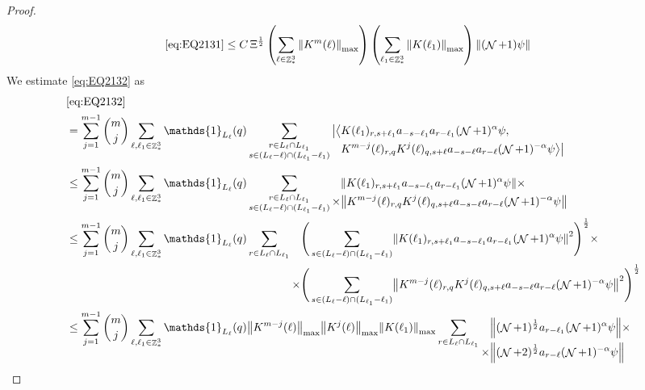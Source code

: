 \documentclass[sn-mathphys, Numbered ,a4paper]{sn-jnl}%
\DeclareMathOperator{\Z}{\mathbb{Z}}
\DeclareMathOperator{\NN}{\mathcal{N}}
\newcommand{\half}{\frac{1}{2}}
\theoremstyle{plain}
\theoremstyle{definition}
\theoremstyle{remark}
\theoremstyle{plain}
\theoremstyle{definition}
\theoremstyle{remark}
\begin{document}
\begin{proof}
\begin{align}
	\eqref{eq:EQ2131}&\leq C\, \Xi^\half \left(\sum\limits_{\ell\in \Z^3_*} \norm{K^m(\ell)}_{\mathrm{max}}\right)\left(  \sum\limits_{ \ell_1\in \Z^3_*}  \norm{ K(\ell_1)}_{\mathrm{max}} \right) \norm{ (\NN+1) \psi}\label{eq:estEQ2131} 
\end{align}  
We estimate \eqref{eq:EQ2132} as
\begin{align}
	&\eqref{eq:EQ2132}\nonumber\\
    &=\sum\limits_{j=1}^{m-1} {{m}\choose j} \sum\limits_{\ell, \ell_1\in \Z^3_*}\mathds{1}_{L_{\ell}}(q) \sum\limits_{\substack{r\in L_{\ell} \cap L_{\ell_1}\\ s \in (L_{\ell}-\ell) \cap (L_{\ell_1}-\ell_1)}} \begin{aligned}[t] \big|\big<&K(\ell_1)_{r,s+\ell_1}a_{-s-\ell_1} a_{r-\ell_1} (\NN+1)^{\alpha} \psi,\nonumber\\  &K^{m-j}(\ell)_{r,q} K^{j}(\ell)_{q,s+\ell} a_{-s-\ell} a_{r-\ell}  (\NN+1)^{-\alpha} \psi\big>\big| \end{aligned} 
    \nonumber\\
    &\leq \sum\limits_{j=1}^{m-1} {{m}\choose j} \sum\limits_{\ell, \ell_1\in \Z^3_*}\mathds{1}_{L_{\ell}}(q) \sum\limits_{\substack{r\in L_{\ell} \cap L_{\ell_1}\\ s \in (L_{\ell}-\ell) \cap (L_{\ell_1}-\ell_1)}} \begin{aligned}[t] &\norm{ K(\ell_1)_{r,s+\ell_1}a_{-s-\ell_1} a_{r-\ell_1} (\NN+1)^{\alpha}\psi}\nonumber \times \\ \times&\norm{ K^{m-j}(\ell)_{r,q} K^{j}(\ell)_{q,s+\ell} a_{-s-\ell}a_{r-\ell} (\NN+1)^{-\alpha} \psi }\end{aligned} \nonumber\\
    &\leq \sum\limits_{j=1}^{m-1} {{m}\choose j} \sum\limits_{\ell, \ell_1\in \Z^3_*} \mathds{1}_{L_{\ell}}(q) \sum\limits_{r\in L_{\ell} \cap L_{\ell_1}}   \begin{aligned}[t] \Bigg(\sum\limits_{ s \in (L_{\ell}-\ell) \cap (L_{\ell_1}-\ell_1)}&\norm{ K(\ell_1)_{r,s+\ell_1}a_{-s-\ell_1} a_{r-\ell_1} (\NN+1)^{\alpha}\psi}^2\Bigg)^\half\nonumber \times \\ \times\Bigg(  \sum\limits_{ s \in (L_{\ell}-\ell) \cap (L_{\ell_1}-\ell_1)}&\norm{ K^{m-j}(\ell)_{r,q} K^{j}(\ell)_{q,s+\ell} a_{-s-\ell}a_{r-\ell} (\NN+1)^{-\alpha} \psi }^2\Bigg)^\half\end{aligned} \nonumber\\
    &\leq \sum\limits_{j=1}^{m-1} {{m}\choose j} \sum\limits_{\ell, \ell_1\in \Z^3_*} \mathds{1}_{L_{\ell}}(q) \norm{K^{m-j}(\ell)}_{\mathrm{max}} \norm{K^{j}(\ell)}_{\mathrm{max}} \norm{ K(\ell_1)}_{\mathrm{max}} \sum\limits_{r\in L_{\ell} \cap L_{\ell_1}} \begin{aligned}[t] &\norm{(\NN+1)^\half a_{r-\ell_1} (\NN+1)^{\alpha}\psi}\nonumber \times \\ \times&\norm{   (\NN+2)^\half a_{r-\ell} (\NN+1)^{-\alpha} \psi }\end{aligned} \nonumber

\end{align}
\end{proof}
\end{document}
